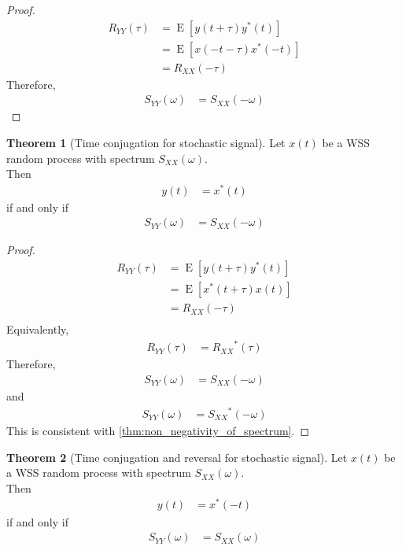 \documentclass[titlepage, fleqn, a4paper, 12pt, twoside]{article}
\theoremstyle{definition}
\theoremstyle{theorem}
\newtheorem{theorem}{Theorem}
\DeclareMathOperator{\expct}{\mathrm{E}}
\begin{document}
\begin{proof}
	\begin{align*}
		R_{Y Y}(\tau) &= \expct\left[ y(t + \tau) y^*(t) \right]\\
		&= \expct\left[ x(-t - \tau) x^*(-t) \right]\\
		&= R_{X X}(-\tau)
	\end{align*}
	Therefore,
	\begin{align*}
		S_{Y Y}(\omega) &= S_{X X}(-\omega)
	\end{align*}
\end{proof}

\begin{theorem}[Time conjugation for stochastic signal]
	Let $x(t)$ be a WSS random process with spectrum $S_{X X}(\omega)$.\\
	Then
	\begin{align*}
		y(t) &= x^*(t)
	\end{align*}
	if and only if
	\begin{align*}
		S_{Y Y}(\omega) &= S_{X X}(-\omega)
	\end{align*}
	\label{thm:time_reversal_for_stochastic_signal}
\end{theorem}

\begin{proof}
	\begin{align*}
		R_{Y Y}(\tau) &= \expct\left[ y(t + \tau) y^*(t) \right]\\
		&= \expct\left[ x^*(t + \tau) x(t) \right]\\
		&= R_{X X}(-\tau)\\
	\end{align*}
	Equivalently,
	\begin{align*}
		R_{Y Y}(\tau) &= {R_{X X}}^*(\tau)
	\end{align*}
	Therefore,
	\begin{align*}
		S_{Y Y}(\omega) &= S_{X X}(-\omega)
	\end{align*}
	and
	\begin{align*}
		S_{Y Y}(\omega) &= {S_{X X}}^*(-\omega)
	\end{align*}
	This is consistent with \cref{thm:non_negativity_of_spectrum}.
\end{proof}

\begin{theorem}[Time conjugation and reversal for stochastic signal]
	Let $x(t)$ be a WSS random process with spectrum $S_{X X}(\omega)$.\\
	Then
	\begin{align*}
		y(t) &= x^*(-t)
	\end{align*}
	if and only if
	\begin{align*}
		S_{Y Y}(\omega) &= S_{X X}(\omega)
	\end{align*}
	\label{thm:time_reversal_for_stochastic_signal}
\end{theorem}
\end{document}
